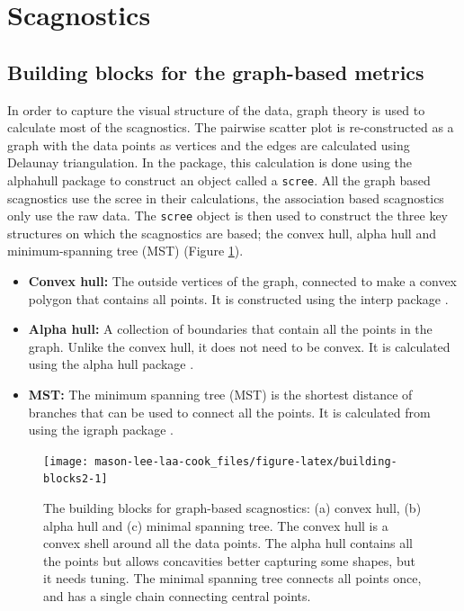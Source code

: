 \section{Scagnostics}\label{scagnostics}

\subsection{Building blocks for the graph-based metrics}\label{building-blocks-for-the-graph-based-metrics}

In order to capture the visual structure of the data, graph theory is used to calculate most of the scagnostics. The pairwise scatter plot is re-constructed as a graph with the data points as vertices and the edges are calculated using Delaunay triangulation. In the package, this calculation is done using the alphahull package \citep{alphahull} to construct an object called a \texttt{scree}. All the graph based scagnostics use the scree in their calculations, the association based scagnostics only use the raw data. The \texttt{scree} object is then used to construct the three key structures on which the scagnostics are based; the convex hull, alpha hull and minimum-spanning tree (MST) (Figure \ref{fig:building-blocks2}).

\begin{itemize}
\item
  \textbf{Convex hull:} The outside vertices of the graph, connected to make a convex polygon that contains all points. It is constructed using the interp package \citep{interp}.
\item
  \textbf{Alpha hull:} A collection of boundaries that contain all the points in the graph. Unlike the convex hull, it does not need to be convex. It is calculated using the alpha hull package \citep{alphahull}.
\item
  \textbf{MST:} The minimum spanning tree (MST) is the shortest distance of branches that can be used to connect all the points. It is calculated from using the igraph package \citep{igraph}.
\end{itemize}

\begin{figure}
\texttt{[image: mason-lee-laa-cook\_files/figure-latex/building-blocks2-1]} \caption{The building blocks for graph-based scagnostics: (a) convex hull, (b) alpha hull and (c) minimal spanning tree. The convex hull is a convex shell around all the data points. The alpha hull contains all the points but allows concavities better capturing some shapes, but it needs tuning. The minimal spanning tree connects all points once, and has a single chain connecting central points.}\label{fig:building-blocks2}
\end{figure}

